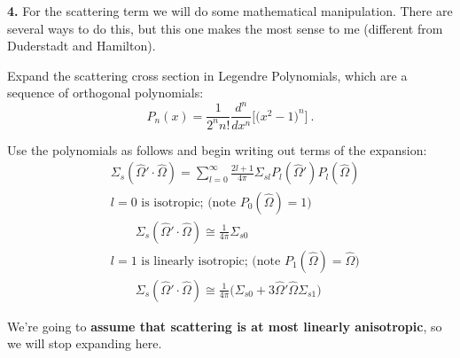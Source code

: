 \documentclass[12pt]{article}
\newcommand{\vOmega}{\ensuremath{\hat{\Omega}}}
\begin{document}

%
%

\textbf{4.} For the scattering term we will do some mathematical manipulation. There are several ways to do this, but this one makes the most sense to me (different from Duderstadt and Hamilton).

Expand the scattering cross section in Legendre Polynomials, which are a sequence of orthogonal polynomials:
%
\[P_n(x) = \frac{1}{2^n n!}\frac{d^n}{dx^n} \bigl[\bigl( x^2 -1 \bigr)^n\bigr] \:.\]

Use the polynomials as follows and begin writing out terms of the expansion:
\begin{align*}
&\Sigma_s(\vOmega' \cdot \vOmega) = \sum_{l=0}^{\infty} \frac{2l+1}{4\pi} \Sigma_{sl} P_l(\vOmega')P_l(\vOmega) \\
%
&l=0 \text{ is isotropic; (note } P_0 (\vOmega) = 1 \text{)}\\
&\qquad \Sigma_s(\vOmega' \cdot \vOmega) \cong \frac{1}{4\pi}\Sigma_{s0} \\
%
&l=1 \text{ is linearly isotropic; (note } P_1 (\vOmega) = \vOmega \text{)}\\
&\qquad \Sigma_s(\vOmega' \cdot \vOmega) \cong \frac{1}{4\pi}\bigl( \Sigma_{s0} + 3\vOmega' \vOmega \Sigma_{s1} \bigr) 
\end{align*}

We're going to \textbf{assume that scattering is at most linearly anisotropic}, so we will stop expanding here.
\end{document}
